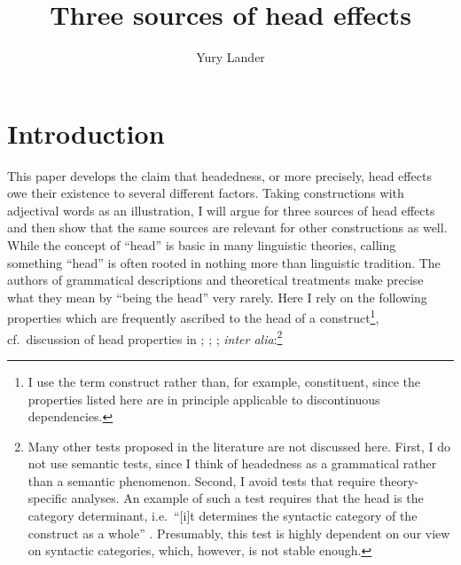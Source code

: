 \documentclass[output=paper
  ,nobabel
  ,draftmode
  ,colorlinks, citecolor=brown
]{langscibook}
\title{Three sources of head effects}
\author{Yury Lander\orcid{0000-0003-1798-7174}\affiliation{HSE University, Moscow}}
\begin{document}
\maketitle

\largerpage[-1]
\section{Introduction}\label{sec-intro-lan}
This paper develops the claim that headedness, or more precisely, head effects owe their existence to several different factors. Taking constructions with adjectival words as an illustration, I will argue for three sources of head effects and then show that the same sources are relevant for other constructions as well. 
While the concept of ``head'' is basic in many linguistic theories, calling something ``head'' is
often rooted in nothing more than linguistic tradition. The authors of grammatical descriptions and
theoretical treatments make precise what they mean by ``being the head'' very rarely. Here I rely on
the following properties which are frequently ascribed to the head of a construct\footnote{I use the
  term construct rather than, for example, constituent, since the properties listed here are in
  principle applicable to discontinuous dependencies.}, cf.\ discussion of head properties in
\citet{Zwicky85a}; \citet{CFMcG93a-ed}; \citet{Croft1996};  \citet[242--254]{Croft2002} \emph{inter
  alia}:\footnote{Many other tests proposed in the literature are not discussed here. First, I do
  not use semantic tests, since I think of headedness as a grammatical rather than a semantic
  phenomenon. Second, I avoid tests that require theory-specific analyses. An example of such a test
  requires that the head is the category determinant, i.e.\ ``[i]t determines the syntactic category of the construct as a whole'' \citep[297]{Zwicky1993}. Presumably, this test is highly dependent on our view on syntactic categories, which, however, is not stable enough.}
\end{document}
